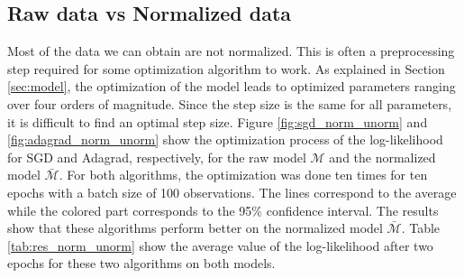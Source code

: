 \documentclass[conference]{IEEEtran}
\begin{document}
\subsection{Raw data vs Normalized data}
\label{sec:norm_unorm}

Most of the data we can obtain are not normalized. This is often a preprocessing step required for some optimization algorithm to work. As explained in Section \ref{sec:model}, the optimization of the model leads to optimized parameters ranging over four orders of magnitude. Since the step size is the same for all parameters, it is difficult to find an optimal step size. Figure \ref{fig:sgd_norm_unorm} and \ref{fig:adagrad_norm_unorm} show the optimization process of the log-likelihood for SGD and Adagrad, respectively, for the raw model $\mathcal{M}$ and the normalized model $\bar{\mathcal{M}}$. For both algorithms, the optimization was done ten times for ten epochs with a batch size of 100 observations. The lines correspond to the average while the colored part corresponds to the 95\% confidence interval. The results show that these algorithms perform better on the normalized model $\bar{\mathcal{M}}$. Table \ref{tab:res_norm_unorm} show the average value of the log-likelihood after two epochs for these two algorithms on both models.
\end{document}
